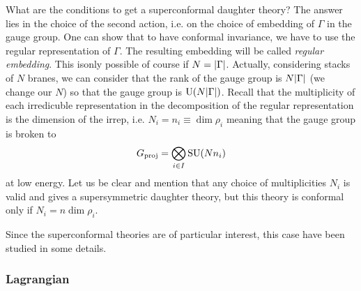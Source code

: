         What are the conditions to get a superconformal daughter theory? The answer lies in the choice of the second action, i.e. on the choice of embedding of $\Gamma$ in the gauge group. One can show \cite{vafa1998} that to have conformal invariance, we have to use the regular representation of $\Gamma$. The resulting embedding will be called \emph{regular embedding}. This isonly possible of course if $N=\abs{\Gamma}$. Actually, considering stacks of $N$ branes, we can consider that the rank of the gauge group is $N\abs{\Gamma}$ (we change our $N$) so that the gauge group is $\text{U}(N\abs{\Gamma})$. Recall that the multiplicity of each irredicuble representation in the decomposition of the regular representation is the dimension of the irrep, i.e. $N_i=n_i\equiv\dim\rho_i$ meaning that the gauge group is broken to
        \begin{equation}
            G_{\text{proj}}=\bigotimes_{i\in I}\text{SU}(N n_i)
        \end{equation}
        at low energy. Let us be clear and mention that any choice of multiplicities $N_i$ is valid and gives a supersymmetric daughter theory, but this theory is conformal only if $N_i=n\dim\rho_i$.

        Since the superconformal theories are of particular interest, this case have been studied in some details.

            \subsubsection{Lagrangian}

